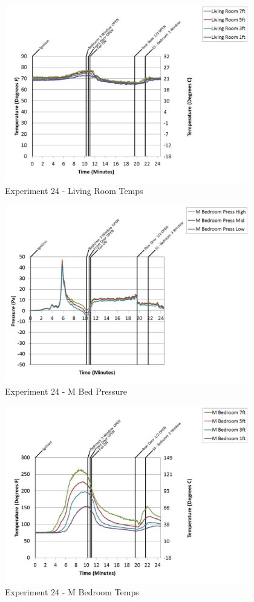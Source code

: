 \documentclass{article}
\begin{document}
\begin{appendices}
	\clearpage

	\begin{figure}[h!]
		\centering
		\includegraphics[height=3.05in]{0_Images/Results_Charts/Exp_24_Charts/LivingRoomTemps.pdf}
		\caption{Experiment 24 - Living Room Temps}
	\end{figure}
 

	\begin{figure}[h!]
		\centering
		\includegraphics[height=3.05in]{0_Images/Results_Charts/Exp_24_Charts/MBedPressure.pdf}
		\caption{Experiment 24 - M Bed Pressure}
	\end{figure}
 
	\clearpage

	\begin{figure}[h!]
		\centering
		\includegraphics[height=3.05in]{0_Images/Results_Charts/Exp_24_Charts/MBedroomTemps.pdf}
		\caption{Experiment 24 - M Bedroom Temps}
	\end{figure}
 


\end{appendices}
\end{document}
